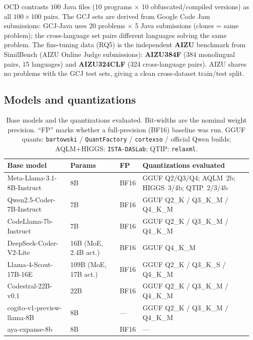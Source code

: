 \documentclass[11pt]{article}
\begin{document}
\noindent OCD contrasts $100$ Java files (10 programs $\times$ 10
obfuscated/compiled versions) as all $100\times100$ pairs. The GCJ sets are
derived from Google Code Jam submissions: GCJ-Java uses 20 problems $\times$ 5
Java submissions (clones = same problem); the cross-language set pairs different
languages solving the same problem. The fine-tuning data (RQ5) is the
independent \textbf{AIZU} benchmark from SimilBench (AIZU Online Judge
submissions): \textbf{AIZU384F} (384 monolingual pairs, 15 languages) and
\textbf{AIZU324CLF} (324 cross-language pairs). AIZU shares no problems with the
GCJ test sets, giving a clean cross-dataset train/test split.

\subsection{Models and quantizations}
\begin{table}[htbp]
  \centering
  \caption{Base models and the quantizations evaluated. Bit-widths are the
           nominal weight precision. ``FP'' marks whether a full-precision
           (BF16) baseline was run. GGUF quants: \texttt{bartowski} /
           \texttt{QuantFactory} / \texttt{cortexso} / official Qwen builds;
           AQLM+HIGGS: \texttt{ISTA-DASLab}; QTIP: \texttt{relaxml}.}
  \label{tab:models}
  \small
  \begin{tabular}{llll}
    \toprule
    \textbf{Base model} & \textbf{Params} & \textbf{FP} & \textbf{Quantizations evaluated} \\
    \midrule
    Meta-Llama-3.1-8B-Instruct     & 8B            & BF16 & GGUF Q2/Q3/Q4; AQLM~2b; HIGGS~3/4b; QTIP~2/3/4b \\
    Qwen2.5-Coder-7B-Instruct      & 7B            & BF16 & GGUF Q2\_K / Q3\_K\_M / Q4\_K\_M \\
    CodeLlama-7b-Instruct          & 7B            & BF16 & GGUF Q2\_K / Q3\_K\_M / Q4\_K\_M \\
    DeepSeek-Coder-V2-Lite         & 16B (MoE, 2.4B act.) & BF16 & GGUF Q4\_K\_M \\
    Llama-4-Scout-17B-16E          & 109B (MoE, 17B act.) & BF16 & GGUF Q2\_K / Q3\_K\_S / Q4\_K\_M \\
    Codestral-22B-v0.1             & 22B           & BF16 & GGUF Q2\_K / Q3\_K\_M / Q4\_K\_M \\
    cogito-v1-preview-llama-8B     & 8B            & ---  & GGUF Q2\_K / Q3\_K\_M / Q4\_K\_M \\
    aya-expanse-8b                 & 8B            & BF16 & --- \\
    \bottomrule
  \end{tabular}
\end{table}
\end{document}
